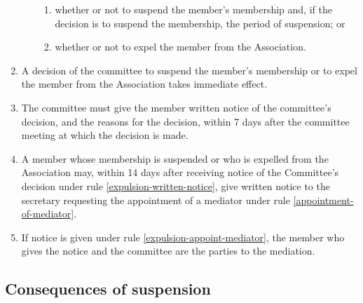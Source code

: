 \documentclass[../constitution.tex]{subfiles}
\begin{document}
\begin{enumerate}
\begin{enumerate}
\begin{enumerate}
    \item whether or not to suspend the member's membership and, if the decision is to suspend the membership, the period of suspension; or
    \item whether or not to expel the member from the Association.
    \end{enumerate}
  \end{enumerate}
\item A decision of the committee to suspend the member's membership or to expel the member from the Association takes immediate effect.
\item The committee must give the member written notice of the committee's decision, and the reasons for the decision, within 7 days after the committee meeting at which the decision is made. \label{expulsion-written-notice}
\item A member whose membership is suspended or who is expelled from the Association may, within 14 days after receiving notice of the Committee's decision under rule \ref{expulsion-written-notice}, give written notice to the secretary requesting the appointment of a mediator under rule \ref{appointment-of-mediator}. \label{expulsion-appoint-mediator}
\item If notice is given under rule \ref{expulsion-appoint-mediator}, the member who gives the notice and the committee are the parties to the mediation.
\end{enumerate}

\hypertarget{consequences-of-suspension}{%
\subsection{Consequences of suspension}\label{consequences-of-suspension}}
\end{document}

